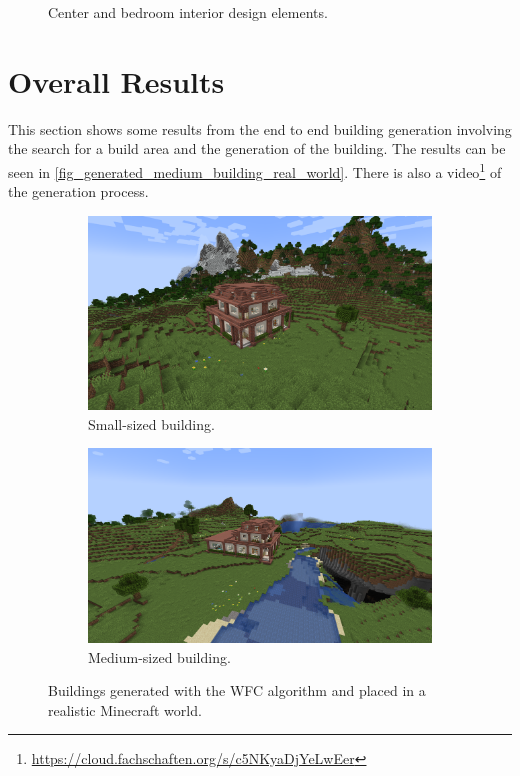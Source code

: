 \documentclass[
oneside,
fontsize=11pt
]{scrartcl}
\begin{document}
\begin{figure}[ht]
\begin{subfigure}[t]{0.3\textwidth}
  \end{subfigure}
  
  \caption{Center and bedroom interior design elements.}
  \label{fig_interior_design_center_bedroom}
\end{figure}


\section{Overall Results}
This section shows some results from the end to end building generation 
involving the search for a build area and the generation of the building.
The results can be seen in \autoref{fig_generated_medium_building_real_world}.
There is also a video\footnote{\url{https://cloud.fachschaften.org/s/c5NKyaDjYeLwEer}} of the generation process.

\begin{figure}[ht]
  \centering
  \begin{subfigure}[t]{0.48\textwidth}
    \includegraphics[width=\textwidth]{images/end2end/generated_small_building.png}
    \caption{Small-sized building.}
  \end{subfigure}
  \hfill
  \begin{subfigure}[t]{0.48\textwidth}
    \includegraphics[width=\textwidth]{images/end2end/generated_medium_building.png}
    \caption{Medium-sized building.}
  \end{subfigure}
  \caption{Buildings generated with the WFC algorithm and placed in a realistic Minecraft world.}
  \label{fig_generated_medium_building_real_world}
\end{figure}
\end{document}
